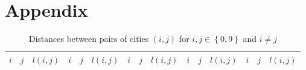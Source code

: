 \documentclass[6pt,oneside]{article}
\begin{document}
\clearpage

\section*{Appendix}

\begin{table}[h]
    \center
    \caption{Distances between pairs of cities $(i,j)$ for $i,j \in \left\lbrace 0, 9\right\rbrace$ and $i\neq j$}
    \label{table:distances}
    \footnotesize
    \begin{tabular}{ccc|ccc|ccc|ccc|ccc}
        $i$ & $j$ & $ l(i, j)$ &
        $i$ & $j$ & $ l(i, j)$ &
        $i$ & $j$ & $ l(i, j)$ &
        $i$ & $j$ & $ l(i, j)$ &
        $i$ & $j$ & $ l(i, j)$
        \\
        \hline

    \end{tabular}
\end{table}


\end{document}

